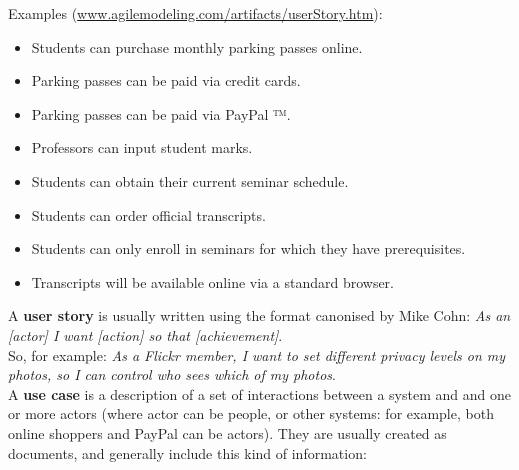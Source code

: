 \begin{minipage}[t]{0.5\linewidth}
\newslide
Examples (\href{https://www.agilemodeling.com/artifacts/userStory.htm}
     {www.agilemodeling.com/artifacts/userStory.htm}):
\begin{itemize}
\item Students can purchase monthly parking passes online.
\item Parking passes can be paid via credit cards.
\item Parking passes can be paid via PayPal ™.
\item Professors can input student marks.
\item Students can obtain their current seminar schedule.
\item Students can order official transcripts.
\item Students can only enroll in seminars for which they have prerequisites.
\item Transcripts will be available online via a standard browser.
\end{itemize}

A \textbf{user story} is usually written using the format canonised by Mike Cohn:
\emph{As an [actor] I want [action] so that [achievement]}.\\
So, for example: \emph{As a Flickr member, I want to set different privacy levels
on my photos, so I can control who sees which of my photos}.\\


A \textbf{use case} is a description of a set of interactions between a
system and and one or more actors (where actor can be people, or other
systems: for example, both online shoppers and PayPal can be actors).
They are usually created as documents, and generally include this kind
of information:


\end{minipage}
